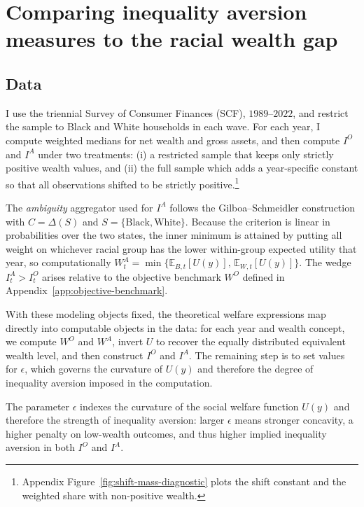 \documentclass[Chp3.tex]{subfiles}
\begin{document}
\section{Comparing inequality aversion measures to the racial wealth gap}
\label{subsec:compute-measures}

\subsection{Data}

\par I use the triennial Survey of Consumer Finances (SCF), $1989$--$2022$, and restrict the sample to Black and White households in each wave. For each year, I compute weighted medians for net wealth and gross assets, and then compute $I^{O}$ and $I^{A}$ under two treatments: (i) a restricted sample that keeps only strictly positive wealth values, and (ii) the full sample which adds a year-specific constant so that all observations shifted to be strictly positive.\footnote{Appendix Figure~\ref{fig:shift-mass-diagnostic} plots the shift constant and the weighted share with non-positive wealth.}

\par The \textit{ambiguity} aggregator used for $I^{A}$ follows the Gilboa--Schmeidler construction with $C=\Delta(S)$ and $S=\{\text{Black},\text{White}\}$. Because the criterion is linear in probabilities over the two states, the inner minimum is attained by putting all weight on whichever racial group has the lower within-group expected utility that year, so computationally $W^{A}_{t}=\min\{\mathbb{E}_{B,t}[U(y)],\,\mathbb{E}_{W,t}[U(y)]\}$. The wedge $I^{A}_{t}>I^{O}_{t}$ arises relative to the objective benchmark $W^{O}$ defined in Appendix~\ref{app:objective-benchmark}.

\par With these modeling objects fixed, the theoretical welfare expressions map directly into computable objects in the data: for each year and wealth concept, we compute $W^{O}$ and $W^{A}$, invert $U$ to recover the equally distributed equivalent wealth level, and then construct $I^{O}$ and $I^{A}$. The remaining step is to set values for $\epsilon$, which governs the curvature of $U(y)$ and therefore the degree of inequality aversion imposed in the computation.

\par The parameter $\epsilon$ indexes the curvature of the social welfare function $U(y)$ and therefore the strength of inequality aversion: larger $\epsilon$ means stronger concavity, a higher penalty on low-wealth outcomes, and thus higher implied inequality aversion in both $I^{O}$ and $I^{A}$.
\end{document}

